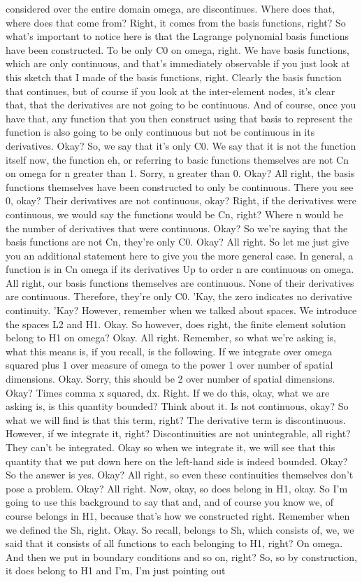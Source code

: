 \documentclass[10pt]{article}
\begin{document}
{considered over the entire domain omega, are discontinues. Where does that, where does that come from? Right, it comes from the basis functions, right? So what's important to notice here is that the Lagrange polynomial basis functions have been constructed. To be only C0 on omega, right. We have basis functions, which are only continuous, and that's immediately observable if you just look at this sketch that I made of the basis functions, right. Clearly the basis function that continues, but of course if you look at the inter-element nodes, it's clear that, that the derivatives are not going to be continuous. And of course, once you have that, any function that you then construct using that basis to represent the function is also going to be only continuous but not be continuous in its derivatives. Okay? So, we say that it's only C0. We say that it is not the function itself now, the function eh, or referring to basic functions themselves are not Cn on omega for n greater than 1. Sorry, n greater than 0. Okay? All right, the basis functions themselves have been constructed to only be continuous. There you see 0, okay? Their derivatives are not continuous, okay? Right, if the derivatives were continuous, we would say the functions would be Cn, right? Where n would be the number of derivatives that were continuous. Okay? So we're saying that the basis functions are not Cn, they're only C0. Okay? All right. So let me just give you an additional statement here to give you the more general case. In general, a function is in Cn omega if its derivatives Up to order n are continuous on omega. All right, our basis functions themselves are continuous. None of their derivatives are continuous. Therefore, they're only C0. 'Kay, the zero indicates no derivative continuity. 'Kay? However, remember when we talked about spaces. We introduce the spaces L2 and H1. Okay. So however, does right, the finite element solution belong to H1 on omega? Okay. All right. Remember, so what we're asking is, what this means is, if you recall, is the following. If we integrate over omega squared plus 1 over measure of omega to the power 1 over number of spatial dimensions. Okay. Sorry, this should be 2 over number of spatial dimensions.  Okay? Times comma x squared, dx. Right. If we do this, okay, what we are asking is, is this quantity bounded? Think about it. Is not continuous, okay? So what we will find is that this term, right? The derivative term is discontinuous. However, if we integrate it, right? Discontinuities are not unintegrable, all right? They can't be integrated. Okay so when we integrate it, we will see that this quantity that we put down here on the left-hand side is indeed bounded. Okay? So the answer is yes. Okay? All right, so even these continuities themselves don't pose a problem. Okay? All right. Now, okay, so does belong in H1, okay. So I'm going to use this background to say that and, and of course you know we, of course belongs in H1, because that's how we constructed right. Remember when we defined the Sh, right. Okay. So recall, belongs to Sh, which consists of, we, we said that it consists of all functions to each belonging to H1, right? On omega. And then we put in boundary conditions and so on, right? So, so by construction, it does belong to H1 and I'm, I'm just pointing out }
\end{document}

